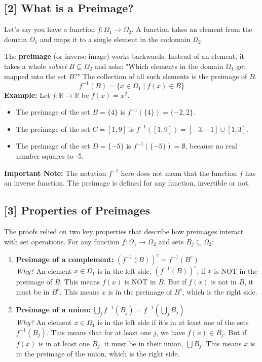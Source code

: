 \documentclass[11pt,a4paper]{article}
\begin{document}
\subsection*{\hypertarget{def:preimage}{\textbf{[2] What is a Preimage?}}}
Let's say you have a function \(f: \Omega_1 \to \Omega_2\). A function takes an element from the domain \(\Omega_1\) and maps it to a single element in the codomain \(\Omega_2\).

The \textbf{preimage} (or inverse image) works backwards. Instead of an element, it takes a whole \textit{subset} \(B \subseteq \Omega_2\) and asks: "Which elements in the domain \(\Omega_1\) get mapped into the set \(B\)?" The collection of all such elements is the preimage of \(B\).
\[ f^{-1}(B) = \{x \in \Omega_1 \mid f(x) \in B \} \]
\textbf{Example:} Let \(f: \mathbb{R} \to \mathbb{R}\) be \(f(x) = x^2\).
\begin{itemize}
    \item The preimage of the set \(B = \{4\}\) is \(f^{-1}(\{4\}) = \{-2, 2\}\).
    \item The preimage of the set \(C = [1, 9]\) is \(f^{-1}([1, 9]) = [-3, -1] \cup [1, 3]\).
    \item The preimage of the set \(D = \{-5\}\) is \(f^{-1}(\{-5\}) = \emptyset\), because no real number squares to -5.
\end{itemize}
\textbf{Important Note:} The notation \(f^{-1}\) here does not mean that the function \(f\) has an inverse function. The preimage is defined for any function, invertible or not.

\subsection*{\hypertarget{def:set-properties}{\textbf{[3] Properties of Preimages}}}
The proofs relied on two key properties that describe how preimages interact with set operations. For any function \(f: \Omega_1 \to \Omega_2\) and sets \(B_j \subseteq \Omega_2\):

\begin{enumerate}
    \item \textbf{Preimage of a complement:} \(\left(f^{-1}(B)\right)^c = f^{-1}(B^c)\) \\
    \textit{Why?} An element \(x \in \Omega_1\) is in the left side, \((f^{-1}(B))^c\), if \(x\) is NOT in the preimage of \(B\). This means \(f(x)\) is NOT in \(B\). But if \(f(x)\) is not in \(B\), it must be in \(B^c\). This means \(x\) is in the preimage of \(B^c\), which is the right side.

    \item \textbf{Preimage of a union:} \(\bigcup_{j} f^{-1}(B_j) = f^{-1}\left(\bigcup_{j} B_j\right)\) \\
    \textit{Why?} An element \(x \in \Omega_1\) is in the left side if it's in at least one of the sets \(f^{-1}(B_j)\). This means that for at least one \(j\), we have \(f(x) \in B_j\). But if \(f(x)\) is in at least one \(B_j\), it must be in their union, \(\bigcup B_j\). This means \(x\) is in the preimage of the union, which is the right side.
\end{enumerate}
\end{document}
